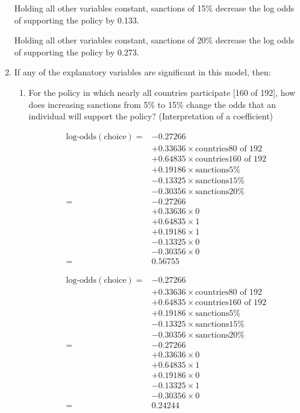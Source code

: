 \documentclass[12pt,letterpaper]{article}
\begin{document}
\begin{enumerate}
	Holding all other variables constant, sanctions of 15\% decrease the log odds of supporting the policy by 0.133.
	
	Holding all other variables constant, sanctions of 20\% decrease the log odds of supporting the policy by 0.273.
	
	\item
	If any of the explanatory variables are significant in this model, then:
	\begin{enumerate}
		\item
		For the policy in which nearly all countries participate [160 of 192], how does increasing sanctions from 5\% to 15\% change the odds that an individual will support the policy? (Interpretation of a coefficient)
		
		\begin{equation}
			\begin{split}
				\text{log-odds}(\text{choice}) = & -0.27266 \\
				& + 0.33636 \times \text{countries80 of 192} \\
				& + 0.64835 \times \text{countries160 of 192} \\
				& + 0.19186 \times \text{sanctions5\%} \\
				& - 0.13325 \times \text{sanctions15\%} \\
				& - 0.30356 \times \text{sanctions20\%}\\
		   	  = &  -0.27266 \\
				& + 0.33636 \times 0 \\
				& + 0.64835 \times 1 \\
				& + 0.19186 \times 1 \\
				& - 0.13325 \times 0 \\
				& - 0.30356 \times 0\\
			  = & 0.56755
			\end{split}
		\end{equation}
		
		\begin{equation}
			\begin{split}
				\text{log-odds}(\text{choice}) = & -0.27266 \\
				& + 0.33636 \times \text{countries80 of 192} \\
				& + 0.64835 \times \text{countries160 of 192} \\
				& + 0.19186 \times \text{sanctions5\%} \\
				& - 0.13325 \times \text{sanctions15\%} \\
				& - 0.30356 \times \text{sanctions20\%}\\
				= &  -0.27266 \\
				& + 0.33636 \times 0 \\
				& + 0.64835 \times 1 \\
				& + 0.19186 \times 0 \\
				& - 0.13325 \times 1 \\
				& - 0.30356 \times 0 \\
				= & 0.24244
			\end{split}
		\end{equation}
		

\end{enumerate}
\end{enumerate}
\end{document}
